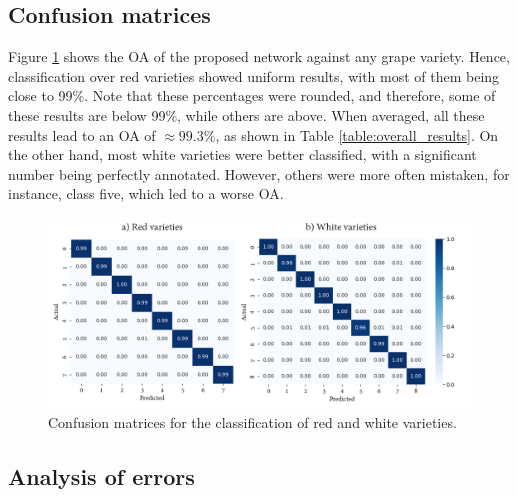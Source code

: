 \subsection{Confusion matrices}

Figure \ref{fig:confusion_matrices} shows the OA of the proposed network against any grape variety. Hence, classification over red varieties showed uniform results, with most of them being close to 99\%. Note that these percentages were rounded, and therefore, some of these results are below 99\%, while others are above. When averaged, all these results lead to an OA of $\approx99.3$\%, as shown in Table \ref{table:overall_results}. On the other hand, most white varieties were better classified, with a significant number being perfectly annotated. However, others were more often mistaken, for instance, class five, which led to a worse OA.  

\begin{figure}[ht]
    \centering
    \includegraphics[width=\linewidth]{figs/vineyard_classification/confusion_matrices.png}
	\caption{Confusion matrices for the classification of red and white varieties. }
	\label{fig:confusion_matrices}
\end{figure} 

\subsection{Analysis of errors}

